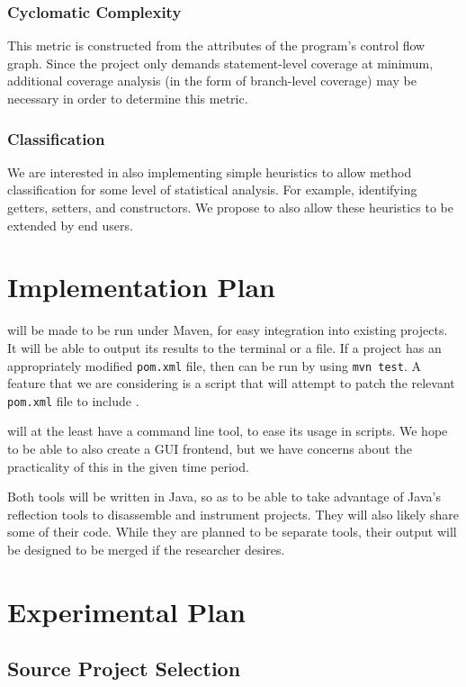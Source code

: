 \subsubsection{Cyclomatic Complexity}

This metric is constructed from the attributes of the program's control flow graph. Since the project only demands statement-level coverage at minimum, additional coverage analysis (in the form of branch-level coverage) may be necessary in order to determine this metric.

\subsubsection{Classification}

We are interested in also implementing simple heuristics to allow method classification for some level of statistical analysis. For example, identifying getters, setters, and constructors. We propose to also allow these heuristics to be extended by end users.

\section{Implementation Plan}
\ct{} will be made to be run under Maven, for easy integration into existing projects. It will be able to output its results to the terminal or a file. If a project has an appropriately modified \texttt{pom.xml} file, then \ct{} can be run by using \texttt{mvn test}. A feature that we are considering is a script that will attempt to patch the relevant \texttt{pom.xml} file to include \ct{}.

\mt{} will at the least have a command line tool, to ease its usage in scripts. We hope to be able to also create a GUI frontend, but we have concerns about the practicality of this in the given time period.

Both tools will be written in Java, so as to be able to take advantage of Java's reflection tools to disassemble and instrument projects. They will also likely share some of their code. While they are planned to be separate tools, their output will be designed to be merged if the researcher desires.

\section{Experimental Plan}

\subsection{Source Project Selection}

